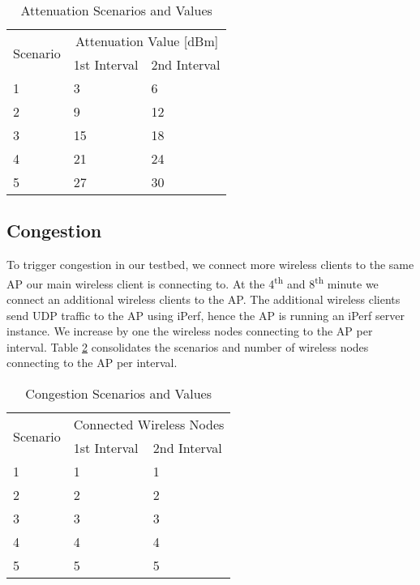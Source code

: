 \begin{table}[h!]
	\begin{center}
		\begin{tabular}{|| m{5em} | m{2cm}| m{2cm} ||}
			\hline
			\multirow{2}{*}{Scenario} & \multicolumn{2}{c||}{Attenuation Value {[}dBm{]}} \\ \cline{2-3} 
			& \multicolumn{1}{l|}{1st Interval} & \multicolumn{1}{l||}{2nd Interval} \\ \hline\hline
			1 & 3 & 6 \\ \hline
			2 & 9 & 12 \\ \hline
			3 & 15 & 18 \\ \hline
			4 & 21 & 24 \\ \hline
			5 & 27 & 30 \\ \hline
		\end{tabular}
	\end{center}
	\caption{Attenuation Scenarios and Values}
	\label{table:Attenuation_Experiment_Values}
\end{table}

\subsection*{Congestion}\label{congestion}

To trigger congestion in our testbed, we connect more wireless clients to the same AP our main wireless client is connecting to. At the 4\textsuperscript{th} and 8\textsuperscript{th} minute we connect an additional wireless clients to the AP. The additional wireless clients send UDP traffic to the AP using iPerf, hence the AP is running an iPerf server instance. We increase by one the wireless nodes connecting to the AP per interval. Table \ref{table:Congestion_Experiment_Values} consolidates the scenarios and number of wireless nodes connecting to the AP per interval.

\begin{table}[h!]
	\begin{center}
		\begin{tabular}{|| m{5em} | m{2cm}| m{2cm} ||}
			\hline
			\multirow{2}{*}{Scenario} & \multicolumn{2}{l||}{Connected Wireless Nodes} \\ \cline{2-3} 
			& \multicolumn{1}{l|}{1st Interval} & \multicolumn{1}{l||}{2nd Interval} \\ \hline\hline
			1 & 1 & 1 \\ \hline
			2 & 2 & 2 \\ \hline
			3 & 3 & 3 \\ \hline
			4 & 4 & 4 \\ \hline
			5 & 5 & 5 \\ \hline
		\end{tabular}
	\end{center}
	\caption{Congestion Scenarios and Values}
	\label{table:Congestion_Experiment_Values}
\end{table}

